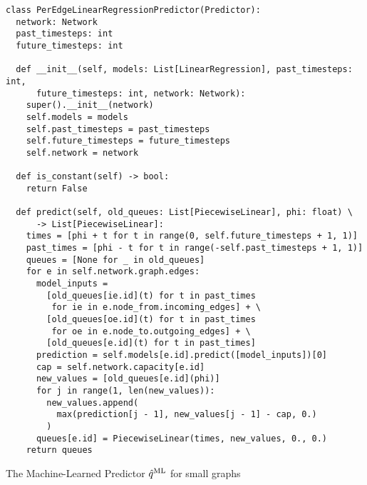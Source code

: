 \begin{algorithm}[H]
  \begin{verbatim}
class PerEdgeLinearRegressionPredictor(Predictor):
  network: Network
  past_timesteps: int
  future_timesteps: int

  def __init__(self, models: List[LinearRegression], past_timesteps: int,
      future_timesteps: int, network: Network):
    super().__init__(network)
    self.models = models
    self.past_timesteps = past_timesteps
    self.future_timesteps = future_timesteps
    self.network = network

  def is_constant(self) -> bool:
    return False

  def predict(self, old_queues: List[PiecewiseLinear], phi: float) \ 
      -> List[PiecewiseLinear]:
    times = [phi + t for t in range(0, self.future_timesteps + 1, 1)]
    past_times = [phi - t for t in range(-self.past_timesteps + 1, 1)]
    queues = [None for _ in old_queues]
    for e in self.network.graph.edges:
      model_inputs = 
        [old_queues[ie.id](t) for t in past_times
         for ie in e.node_from.incoming_edges] + \
        [old_queues[oe.id](t) for t in past_times
         for oe in e.node_to.outgoing_edges] + \
        [old_queues[e.id](t) for t in past_times]
      prediction = self.models[e.id].predict([model_inputs])[0]
      cap = self.network.capacity[e.id]
      new_values = [old_queues[e.id](phi)]
      for j in range(1, len(new_values)):
        new_values.append(
          max(prediction[j - 1], new_values[j - 1] - cap, 0.)
        )
      queues[e.id] = PiecewiseLinear(times, new_values, 0., 0.)
    return queues
  \end{verbatim}
  \caption{The Machine-Learned Predictor $\hat q^{\text{ML}}$ for small graphs}
  \label{alg:ml-predictor}
\end{algorithm}
    